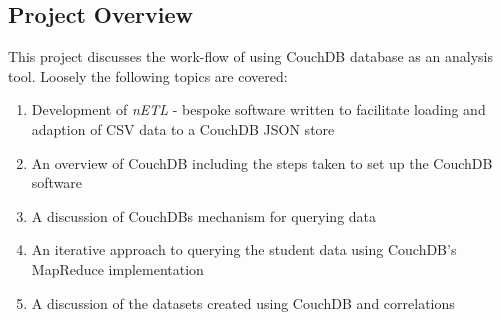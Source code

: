 \subsection{Project Overview}
This project discusses the work-flow of using CouchDB database as an analysis tool. Loosely the following topics are covered:

\begin{enumerate}
    \item Development of \textit{nETL} - bespoke software written to facilitate loading and adaption of CSV data to a CouchDB JSON store
    \item An overview of CouchDB including the steps taken to set up the CouchDB software
    \item A discussion of CouchDBs mechanism for querying data
    \item An iterative approach to querying the student data using CouchDB's MapReduce implementation
    \item A discussion of the datasets created using CouchDB and correlations
\end{enumerate}